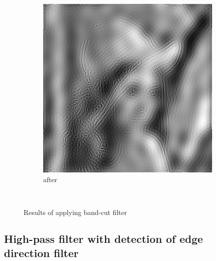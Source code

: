 \documentclass[12pt]{article}
\begin{document}
\begin{figure}[H]
\begin{subfigure}[t]{\subfiguresize}
        \includegraphics[width=\textwidth]{img/lena_bandcut.png}
        \caption{after}
    \end{subfigure}\\[1em]
    \caption{Results of applying band-cut filter}
\end{figure}  
\subsection{High-pass filter with detection of edge direction filter}
\end{document}
